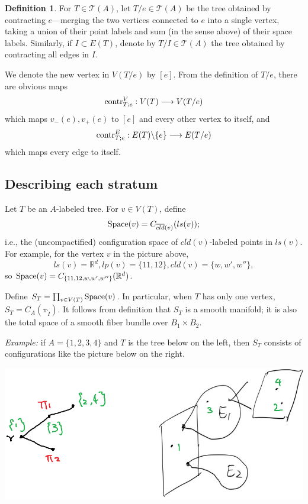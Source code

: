 \documentclass[11pt]{article}
\theoremstyle{definition}
\newtheorem{dfn}[thm]{Definition}
\theoremstyle{remark}
\def\ov#1{\overline{#1}}
\def\R{\mathbb{R}}
\def\cT{\mathcal{T}}
\def\rI{{\mathring{I}}}
\def\tn#1{\textnormal{#1}}
\begin{document}
\begin{dfn}
For $T\in\cT(A)$, let $T/e\in\cT(A)$ be the tree obtained by contracting $e$---merging the two vertices connected to $e$ into a single vertex, taking a union of their point labels and sum (in the sense above) of their space labels. 
Similarly, if $I\subset E(T)$, denote by $T/I\in\cT(A)$ the tree obtained by contracting all edges in $I$. 

%

We denote the new vertex in $V(T/e)$ by $[e]$. 
From the definition of $T/e$, there are obvious maps 
$$\tn{contr}^V_{T;e}:V(T)\longrightarrow V(T/e)$$
which maps $v_-(e),v_+(e)$ to $[e]$ and every other vertex to itself, and
$$\tn{contr}^E_{T;e}:E(T)\backslash\{e\}\longrightarrow E(T/e)$$
which maps every edge to itself. 
\end{dfn}

\subsection{Describing each stratum}
\label{stratum2_sec}

Let $T$ be an $A$-labeled tree. 
For $v\in V(T)$, define  
$$\tn{Space}(v)=C_{\ov{cld}(v)}(ls(v));$$
i.e., the (uncompactified) configuration space of $\ov{cld}(v)$-labeled points in $ls(v)$. 
For example, for the vertex $v$ in the picture above, $$ls(v)=\R^d, lp(v)=\{11,12\}, cld(v)=\{w,w',w''\},$$
so $\tn{Space}(v)=C_{\{11,12,w,w',w''\}}(\R^d)$. 

Define $S_T=\prod_{v\in V(T)}\tn{Space}(v)$. 
In particular, when $T$ has only one vertex, $S_T=C_A(\pi_\rI)$. 
It follows from definition that $S_T$ is a smooth manifold; it is also the total space of a smooth fiber bundle over $B_1\times B_2$. 

{\it Example:} if $A=\{1,2,3,4\}$ and $T$ is the tree below on the left, then $S_T$ consists of configurations like the picture below on the right. 

\includegraphics[scale=0.5]{ST_fig}
\end{document}
